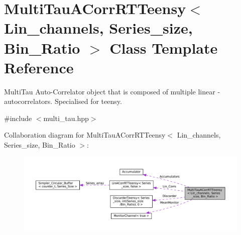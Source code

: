 \hypertarget{classMultiTauACorrRTTeensy}{}\section{Multi\+Tau\+A\+Corr\+R\+T\+Teensy$<$ Lin\+\_\+channels, Series\+\_\+size, Bin\+\_\+\+Ratio $>$ Class Template Reference}
\label{classMultiTauACorrRTTeensy}


Multi\+Tau Auto-\/\+Correlator object that is composed of multiple linear -\/ autocorrelators. Specialised for teensy.  




{\ttfamily \#include $<$multi\+\_\+tau.\+hpp$>$}



Collaboration diagram for Multi\+Tau\+A\+Corr\+R\+T\+Teensy$<$ Lin\+\_\+channels, Series\+\_\+size, Bin\+\_\+\+Ratio $>$\+:\nopagebreak
\begin{figure}[H]
\begin{center}
\leavevmode
\includegraphics[width=350pt]{classMultiTauACorrRTTeensy__coll__graph}
\end{center}
\end{figure}
